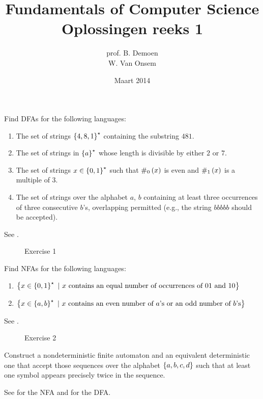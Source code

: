 \documentclass{article}
\title{Fundamentals of Computer Science\\Oplossingen reeks 1}
\author{prof. B. Demoen\\W. Van Onsem}
\date{Maart 2014}
\begin{document}
\maketitle
\begin{exercise}
Find DFAs for the following languages:
\begin{enumerate}
 \item The set of strings $\left\{ 4,8,1 \right\}^{\star}$ containing the substring $481$.
 \item The set of strings in $\left\{ a \right\}^{\star}$ whose length is divisible by either $2$ or $7$.
 \item The set of strings $x\in\left\{ 0,1 \right\}^{\star}$ such that $\#_0\left( x \right)$ is even and $\#_1\left( x \right)$ is a multiple of $3$.
 \item The set of strings over the alphabet $a$, $b$ containing at least three occurrences of three consecutive $b$'s, overlapping permitted (e.g., the string $bbbbb$ should be accepted).
\end{enumerate}
\begin{answer}See .
\begin{figure}[H]
\centering
{}
\caption{Exercise 1}
\end{figure}
\end{answer}
\end{exercise}
\begin{exercise}
Find NFAs for the following languages:
\begin{enumerate}
 \item $\left\{ x\in\left\{ 0,1 \right\}^{\star}\ |\ \mbox{$x$ contains an equal number of occurrences of $01$ and $10$} \right\}$
 \item $\left\{ x\in\left\{ a,b \right\}^{\star}\ |\ \mbox{$x$ contains an even number of $a$'s or an odd number of $b$'s} \right\}$
\end{enumerate}
\begin{answer}See .
\begin{figure}[H]
\centering
{}
\caption{Exercise 2}
\end{figure}
\end{answer}
\end{exercise}
\begin{exercise}
Construct a nondeterministic finite automaton and an equivalent deterministic one that accept those sequences over the alphabet $\left\{ a,b,c,d \right\}$ such that at least one symbol appears precisely twice in the sequence.
\begin{answer}
See  for the NFA and  for the DFA.
\end{answer}
\end{exercise}
\end{document}
